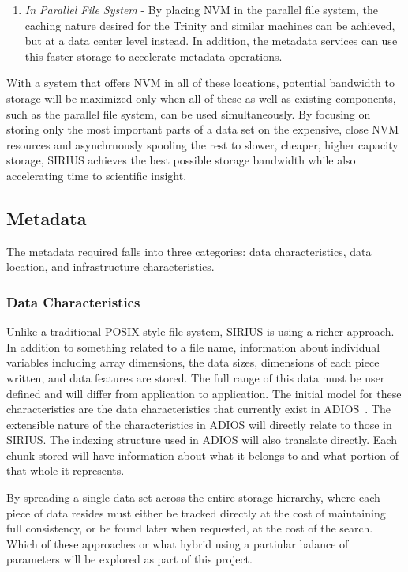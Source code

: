 \begin{enumerate}
\item {\em In Parallel File System} - By placing NVM in the parallel file
system, the caching nature desired for the Trinity and similar machines can be
achieved, but at a data center level instead. In addition, the metadata
services can use this faster storage to accelerate metadata operations.

\end{enumerate}

With a system that offers NVM in all of these locations, potential bandwidth to
storage will be maximized only when all of these as well as existing
components, such as the parallel file system, can be used simultaneously. By
focusing on storing only the most important parts of a data set on the
expensive, close NVM resources and asynchrnously spooling the rest to slower,
cheaper, higher capacity storage, SIRIUS achieves the best possible storage
bandwidth while also accelerating time to scientific insight.

\subsection{Metadata}

The metadata required falls into three categories: data characteristics, data
location, and infrastructure characteristics.

\subsubsection{Data Characteristics}

Unlike a traditional POSIX-style file system, SIRIUS is using a richer
approach.  In addition to something related to a file name, information about
individual variables including array dimensions, the data sizes, dimensions of
each piece written, and data features are stored. The full range of this data
must be user defined and will differ from application to application. The
initial model for these characteristics are the data characteristics that
currently exist in ADIOS~\cite{lofstead:2009:adaptable}. The extensible nature
of the characteristics in ADIOS will directly relate to those in SIRIUS. The
indexing structure used in ADIOS will also translate directly. Each chunk
stored will have information about what it belongs to and what portion of that
whole it represents.


By spreading a single data set across the entire storage hierarchy, where each
piece of data resides must either be tracked directly at the cost of
maintaining full consistency, or be found later when requested, at the cost of
the search. Which of these approaches or what hybrid using a partiular balance
of parameters will be explored as part of this project.

